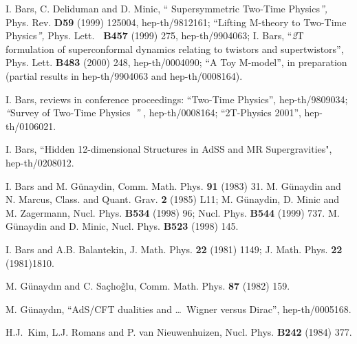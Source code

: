 \documentclass[a4paper,aps,preprint,nofootinbib]{revtex4}
\begin{document}
\begin{thebibliography}{9}
 I. Bars, C. Deliduman and D. Minic, \textquotedblleft
Supersymmetric Two-Time Physics\textit{\textquotedblright, }Phys. Rev.
\textbf{D59} (1999) 125004, hep-th/9812161; \textquotedblleft Lifting
M-theory to Two-Time Physics\textit{\textquotedblright, }Phys. Lett. \textbf{%
\ B457} (1999) 275, hep-th/9904063; \newline
I. Bars, \textquotedblleft\textit{2}T formulation of superconformal dynamics
relating to twistors and supertwistors\textquotedblright, Phys. Lett.
\textbf{B483 }(2000) 248, hep-th/0004090; \textquotedblleft A Toy
M-model\textquotedblright, in preparation (partial results in hep-th/9904063
and hep-th/0008164).

 I. Bars, reviews in conference proceedings:
\textquotedblleft Two-Time Physics\textquotedblright, hep-th/9809034;
\textit{\textquotedblleft}Survey of Two-Time Physics\textit{\
\textquotedblright} , hep-th/0008164; \textquotedblleft2T-Physics
2001\textquotedblright, hep-th/0106021.

 I. Bars, \textquotedblleft Hidden 12-dimensional Structures
in AdS\myHighlight{$_{5}\times$}\coordHE{}S\myHighlight{$^{5}$}\coordHE{} and M\myHighlight{$^4\times$}\coordHE{}R\coordHE{} Supergravities",
hep-th/0208012.

 I. Bars and M. G\"{u}naydin, Comm. Math. Phys.
\textbf{91 }(1983) 31. M. G\"{u}naydin and N. Marcus, Class. and Quant.
Grav. \textbf{2 }(1985) L11; M. G\"{u}naydin, D. Minic and M. Zagermann,
Nucl. Phys. \textbf{B534 }(1998) 96; Nucl. Phys. \textbf{B544 }(1999) 737.
M. G\"{u}naydin and D. Minic, Nucl. Phys. \textbf{B523 }(1998) 145.

 I. Bars and A.B. Balantekin, J. Math. Phys. \textbf{22} (1981)
1149; J. Math. Phys. \textbf{22} (1981)1810.

 M. G\"{u}nayd\i n and C. Sa\c{c}l\i o\~{g}lu, Comm. Math. Phys.
\textbf{87} (1982) 159.

 M. G\"{u}nayd\i n, \textquotedblleft AdS/CFT dualities and
\ldots\ Wigner versus Dirac\textquotedblright, hep-th/0005168.

 H.J.\ Kim, L.J. Romans and P. van Nieuwenhuizen, Nucl. Phys.
\textbf{B242} (1984) 377.
\end{thebibliography}
\end{document}
